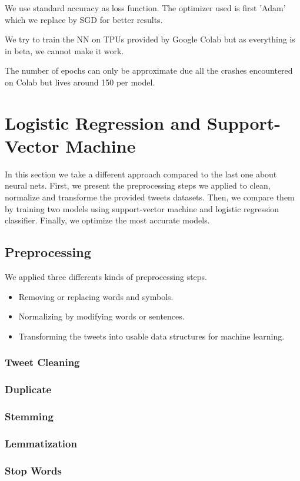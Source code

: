 \documentclass[11pt, a4paper, twocolumn]{article}
\begin{document}
We use standard accuracy as loss function. The optimizer used is first 'Adam' which we replace by SGD for better results.

We try to train the NN on TPUs provided by Google Colab but as everything is in beta, we cannot make it work.

The number of epochs can only be approximate due all the crashes encountered on Colab but lives around 150 per model.
\section{Logistic Regression and Support-Vector Machine}
In this section we take a different approach compared to the last one about neural nets. First, we present the preprocessing steps we applied to clean, normalize and transforme the provided tweets datasets. Then, we compare them by training two models using support-vector machine and logistic regression classifier. Finally, we optimize the most accurate models.

\subsection{Preprocessing}
We applied three differents kinds of preprocessing steps.
\begin{itemize}
	\item Removing or replacing words and symbols.
	\item Normalizing by modifying words or sentences.
	\item Transforming the tweets into usable data structures for machine learning.
\end{itemize}

\subsubsection{Tweet Cleaning}
\subsubsection{Duplicate}
\subsubsection{Stemming}
\subsubsection{Lemmatization}
\subsubsection{Stop Words}
\end{document}
